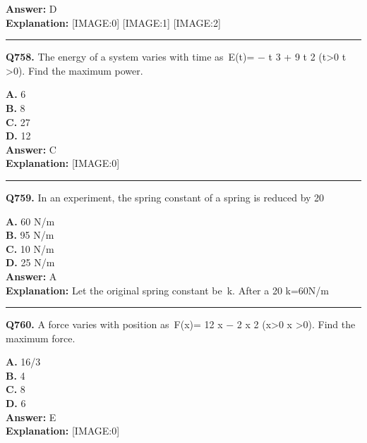 \documentclass[12pt]{article}
\begin{document}
\textbf{Answer:} D \\
\textbf{Explanation:} [IMAGE:0]
[IMAGE:1]
[IMAGE:2]

\hrule
\vspace{1em}


\noindent
\textbf{Q758.} The energy of a system varies with time as E(t)=
−
t
3
+
9
t
2
(t>0
t
>0). Find the maximum power.



\textbf{A.} 6 \\
\textbf{B.} 8 \\
\textbf{C.} 27 \\
\textbf{D.} 12 \\

\textbf{Answer:} C \\
\textbf{Explanation:} [IMAGE:0]

\hrule
\vspace{1em}


\noindent
\textbf{Q759.} In an experiment, the spring constant of a spring is reduced by 20%



\textbf{A.} 60 N/m \\
\textbf{B.} 95 N/m \\
\textbf{C.} 10 N/m \\
\textbf{D.} 25 N/m \\

\textbf{Answer:} A \\
\textbf{Explanation:} Let the original spring constant be k. After a 20%
k=60N/m

\hrule
\vspace{1em}


\noindent
\textbf{Q760.} A force varies with position as F(x)=
12
x
−
2
x
2
(x>0
x
>0). Find the maximum force.



\textbf{A.} 16/3 \\
\textbf{B.} 4 \\
\textbf{C.} 8 \\
\textbf{D.} 6 \\

\textbf{Answer:} E \\
\textbf{Explanation:} [IMAGE:0]
\end{document}
